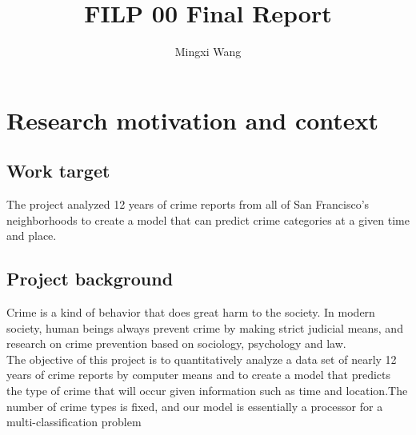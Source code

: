 \documentclass{amsart}
\begin{document}
%
%
\title[Report]{FILP 00 Final Report}%

\author{Mingxi Wang}
\address[A.~1]{School of Computer Science,\\ 
Jilin University, ChangChun 130012, China}%


%
\date{\gitAuthorDate}%




\maketitle
\tableofcontents

\newpage

%
\section{Research motivation and context}



\subsection{Work target}
The project analyzed 12 years of crime reports from all of San Francisco's neighborhoods to create a model that can predict crime categories at a given time and place.\\

\subsection{Project background}
Crime is a kind of behavior that does great harm to the society. In modern society, human beings always prevent crime by making strict judicial means, and research on crime prevention based on sociology, psychology and law.\\

\hspace*{0.6cm}The objective of this project is to quantitatively analyze a data set of nearly 12 years of crime reports by computer means and to create a model that predicts the type of crime that will occur given information such as time and location.The number of crime types is fixed, and our model is essentially a processor for a multi-classification problem\\
\end{document}
